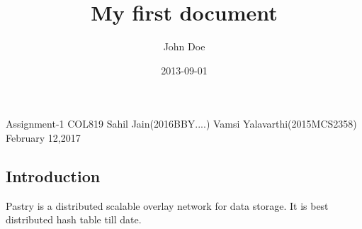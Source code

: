 \documentclass[10pt]{article}
\title{My first document}
\date{2013-09-01}
\author{John Doe}
\begin{document}
\centering
Assignment-1
\linebreak
COL819
\linebreak
\linebreak
Sahil Jain(2016BBY....)
\linebreak
Vamsi Yalavarthi(2015MCS2358)
\linebreak
February 12,2017
\linebreak

\begin{flushleft}
\section{Introduction}
Pastry is a distributed scalable overlay network for data storage. It is best distributed hash table till date.
\end{flushleft}
\end{document}
